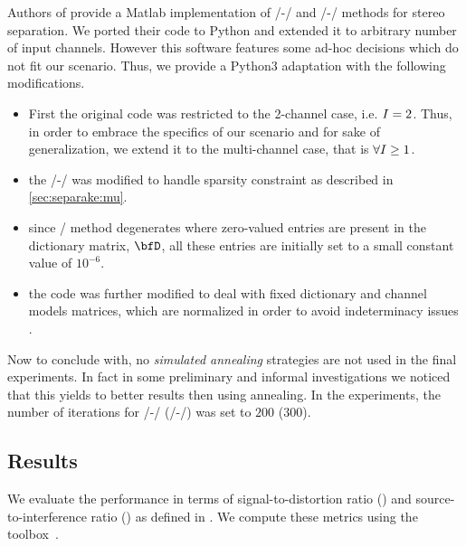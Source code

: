  Authors of  provide a Matlab implementation of \MU/-\NMF/ and \EM/-\NMF/ methods for stereo separation.
We ported their code to Python and extended it to arbitrary number of input channels.
However this software features some ad-hoc decisions which do not fit our scenario.
Thus, we provide a Python3 adaptation with the following modifications.
\begin{itemize}
    \item First the original code was restricted to the 2-channel case, i.e.  $I = 2$.
    Thus, in order to embrace the specifics of our scenario and for sake of generalization, we extend it to the multi-channel case, that is $\forall I \geq 1$.
    \item the \MU/-\NMF/ was modified to handle sparsity constraint as described in \ref{sec:separake:mu}.
    \item since \EM/ method degenerates where zero-valued entries are present in the dictionary matrix, $\mD$, all these entries are initially set to a small constant value of $10^{-6}$.
    \item the code was further modified to deal with fixed dictionary and channel models matrices, which are normalized in order to avoid indeterminacy issues .
\end{itemize}
Now to conclude with, no \textit{simulated annealing} strategies are not used in the final experiments.
In fact in some preliminary and informal investigations we noticed that this yields to better results then using annealing.
In the experiments, the number of iterations for \MU/-\NMF/ (\EM/-\NMF/) was set to $200$ ($300$).

\subsection{Results}
\label{sec:results}

We evaluate the performance in terms of signal-to-distortion ratio (\SDR) and source-to-interference ratio (\SIR) as defined in .
We compute these metrics using the  toolbox~.

